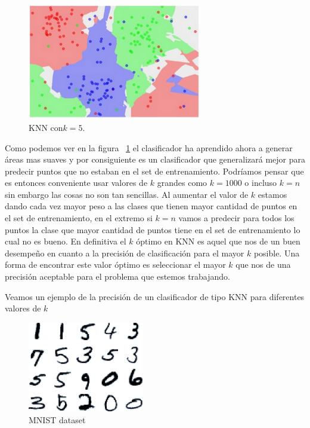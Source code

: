 \begin{figure}[!htb]
\centering
\includegraphics[width=3in]{figures/kn5-fig.png}

\caption{KNN con$ k=5$.}
\label{fig:knn5}
\end{figure}

Como podemos ver en la figura ~\ref{fig:knn5}  el clasificador ha aprendido ahora a generar áreas mas suaves y por consiguiente es un clasificador que generalizará mejor para predecir puntos que no estaban en el set de entrenamiento. Podríamos pensar que es entonces conveniente usar valores de $k$ grandes como $k=1000$ o incluso $k=n$ sin embargo las cosas no son tan sencillas. Al aumentar el valor de $k$ estamos dando cada vez mayor peso a las clases que tienen mayor cantidad de puntos en el set de entrenamiento, en el extremo si $k=n$ vamos a predecir para todos los puntos la clase que mayor cantidad de puntos tiene en el set de entrenamiento lo cual no es bueno. En definitiva el $k$ óptimo en KNN es aquel que nos de un buen desempeño en cuanto a la precisión de clasificación para el mayor $k$ posible. Una forma de encontrar este valor óptimo es seleccionar el mayor $k$ que nos de una precisión aceptable para el problema que estemos trabajando.

Veamos un ejemplo de la precisión de un clasificador de tipo KNN para diferentes valores de $k$

\begin{figure}[!htb]
\centering
\includegraphics[width=2in]{figures/mnist-fig-1.png}
\caption{MNIST dataset}
\label{fig16}

\end{figure}

